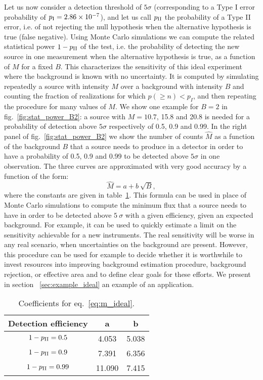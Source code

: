 \documentclass[twocolumn]{aastex61}
\renewcommand{\textbf}{}
\begin{document}
    Let us now consider a detection threshold of $5\sigma$ (corresponding to a Type I error probability of $p_{\rm I} = 2.86 \times 10^{-7}$), and let us call $p_{\rm II}$ the probability of a Type II error, i.e. of not rejecting the null hypothesis when the alternative hypothesis is true (false negative). Using Monte Carlo simulations we can compute the related statistical power $1-p_{\rm II}$ of the test, i.e. the probability of detecting the new source in one measurement when the alternative hypothesis is true, as a function of $M$ for a fixed $B$. This characterizes the sensitivity of this ideal experiment where the background is known with no uncertainty. It is computed by simulating repeatedly a source with intensity $M$ over a background with intensity $B$ and counting the fraction of realizations for which $p(\geq n) < p_{I}$, and then repeating the procedure for many values of $M$. We show one example for $B=2$ in 
fig.~\ref{fig:stat_power_B2}: a source with $M=10.7$, 15.8 and 20.8 is needed for a probability of detection above $5\sigma$ respectively of 0.5, 0.9 and 0.99. In the right panel of fig.~\ref{fig:stat_power_B2} we show the number of counts $\hat{M}$ as a function of the background $B$ that a source needs to produce in a detector in order to have a probability of 0.5, 0.9 and 0.99 to be detected above $5\sigma$ in one observation. The three curves are approximated with very good accuracy by a function of the form:
\begin{equation}
\hat{M} = a + b ~ \sqrt{B},
\label{eq:m_ideal}
\end{equation}
where the constants are given in table~\ref{tab:coefficients}. This formula can be used in place of Monte Carlo simulations to compute the minimum flux that a source needs to have in order to be detected above $5~\sigma$ with a given efficiency, given an expected background. For example, it can be used to quickly estimate a limit on the sensitivity achievable for a new instruments. The real sensitivity will be worse in any real scenario, when uncertainties on the background are present. \textbf{However, this procedure can be used for example to decide whether it is worthwhile to invest resources into improving background estimation procedure, background rejection, or effective area and to define clear goals for these efforts. We present in section ~\ref{sec:example_ideal} an example of an application.}

\begin{table}
\centering
\begin{tabular}{ c|c|c }
  Detection efficiency & a & b \\
\hline
  $1-p_{\rm II} = 0.5$ &  4.053 & 5.038 \\
  $1-p_{\rm II} = 0.9$ & 7.391 & 6.356 \\
  $1-p_{\rm II} = 0.99$ & 11.090 & 7.415 \\
\end{tabular}
\caption{Coefficients for eq.~\ref{eq:m_ideal}.}
\label{tab:coefficients}
\end{table}
\end{document}
